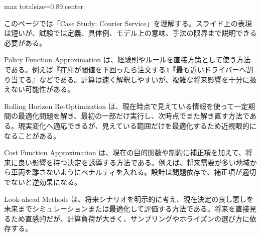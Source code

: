\begin{minipage}[t]{0.58\textwidth}
\begin{adjustbox}{max totalsize={\textwidth}{0.89\textheight},center}
\begin{minipage}{\textwidth}\scriptsize
{}このページでは「Case Study: Courier Service」を理解する。スライド上の表現は短いが、試験では定義、具体例、モデル上の意味、手法の限界まで説明できる必要がある。\par
Policy Function Approximation は、経験則やルールを直接方策として使う方法である。例えば『在庫が閾値を下回ったら注文する』『最も近いドライバーへ割り当てる』などである。計算は速く解釈しやすいが、複雑な将来影響を十分に扱えない可能性がある。\par
Rolling Horizon Re-Optimization は、現在時点で見えている情報を使って一定期間の最適化問題を解き、最初の一部だけ実行し、次時点でまた解き直す方法である。現実変化へ適応できるが、見えている範囲だけを最適化するため近視眼的になることがある。\par
Cost Function Approximation は、現在の目的関数や制約に補正項を加えて、将来に良い影響を持つ決定を誘導する方法である。例えば、将来需要が多い地域から車両を離さないようにペナルティを入れる。設計は問題依存で、補正項が適切でないと逆効果になる。\par
Look-ahead Methods は、将来シナリオを明示的に考え、現在決定の良し悪しを未来までシミュレーションまたは最適化して評価する方法である。将来を直接見るため直感的だが、計算負荷が大きく、サンプリングやホライズンの選び方に依存する。\par

\end{minipage}
\end{adjustbox}
\end{minipage}
